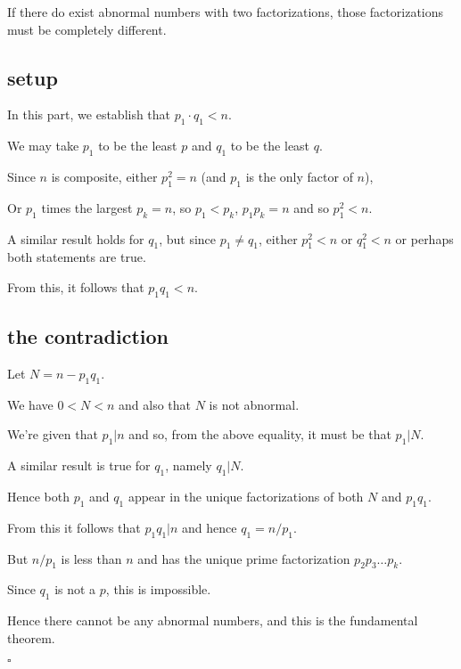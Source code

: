 \documentclass[11pt, oneside]{article}
\begin{document}
If there do exist abnormal numbers with two factorizations, those factorizations must be completely different.

\subsection*{setup}

In this part, we establish that $p_1 \cdot q_1 < n$.

We may take $p_1$ to be the least $p$ and $q_1$ to be the least $q$.  

Since $n$ is composite, either $p_1^2 = n$ (and $p_1$ is the only factor of $n$),

Or $p_1$ times the largest $p_k = n$, so $p_1 < p_k$, $p_1 p_k = n$ and so $p_1^2 < n$.

A similar result holds for $q_1$, but since $p_1 \ne q_1$, either $p_1^2 < n$ or $q_1^2 < n$ or perhaps both statements are true.

From this, it follows that $p_1 q_1 < n$. 

\subsection*{the contradiction} 

Let $N = n - p_1 q_1$.

We have $0 < N < n$ and also that $N$ is not abnormal.

We're given that $p_1 | n$ and so, from the above equality, it must be that $p_1 | N$.

A similar result is true for $q_1$, namely $q_1 | N$.  

Hence both $p_1$ and $q_1$ appear in the unique factorizations of both $N$ and $p_1 q_1$.

From this it follows that $p_1 q_1 | n$ and hence $q_1 = n/p_1$.  

But $n/p_1$ is less than $n$ and has the unique prime factorization $p_2 p_3 \dots p_k$.

Since $q_1$ is not a $p$, this is impossible.  

Hence there cannot be any abnormal numbers, and this is the fundamental theorem.

$\square$
\end{document}
